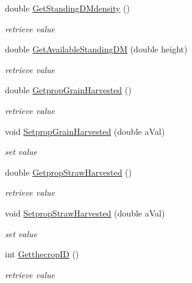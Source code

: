 \begin{DoxyCompactItemize}
\item 
double \hyperlink{classpatch_interface_class_a9af6335434ca1be9ad6ea50bb4a91530}{GetStandingDMdensity} ()
\begin{DoxyCompactList}\small\item\em retrieve value \item\end{DoxyCompactList}\item 
double \hyperlink{classpatch_interface_class_aeed4d997725c93a172c2bf3e12916ce7}{GetAvailableStandingDM} (double height)
\begin{DoxyCompactList}\small\item\em retrieve value \item\end{DoxyCompactList}\item 
double \hyperlink{classpatch_interface_class_a209ae68a78f632e7724dc8aba7c30959}{GetpropGrainHarvested} ()
\begin{DoxyCompactList}\small\item\em retrieve value \item\end{DoxyCompactList}\item 
void \hyperlink{classpatch_interface_class_aa1f55cbaf1895b13dd8a7902e90f9714}{SetpropGrainHarvested} (double aVal)
\begin{DoxyCompactList}\small\item\em set value \item\end{DoxyCompactList}\item 
double \hyperlink{classpatch_interface_class_ae34dc1ee39f2f8d66fc540fb17c01fe3}{GetpropStrawHarvested} ()
\begin{DoxyCompactList}\small\item\em retrieve value \item\end{DoxyCompactList}\item 
void \hyperlink{classpatch_interface_class_ad84c3cc82cc633329f55e47a1f14b9e7}{SetpropStrawHarvested} (double aVal)
\begin{DoxyCompactList}\small\item\em set value \item\end{DoxyCompactList}\item 
int \hyperlink{classpatch_interface_class_a84224ea36bd61be5e8c25c4fcdc2d350}{GetthecropID} ()
\begin{DoxyCompactList}\small\item\em retrieve value \item\end{DoxyCompactList}\item 

\end{DoxyCompactItemize}
